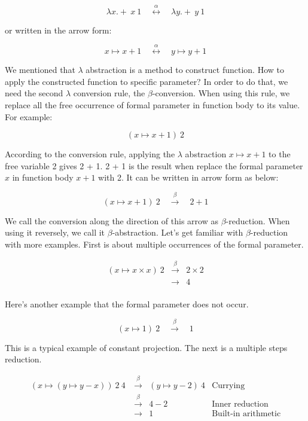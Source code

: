 \documentclass{article}
\begin{document}
\[
\lambda x . +\ x\ 1 \quad \overset{\alpha}{\longleftrightarrow} \quad \lambda y . +\ y\ 1
\]


or written in the arrow form:

\[
x \mapsto x + 1 \quad \overset{\alpha}{\longleftrightarrow} \quad y \mapsto y + 1
\]

We mentioned that $\lambda$ abstraction is a method to construct function. How to apply the constructed function to specific parameter? In order to do that, we need the second $\lambda$ conversion rule, the $\beta$-conversion. When using this rule, we replace all the free occurrence of formal parameter in function body to its value. For example:

\[
(x \mapsto x + 1)\ 2
\]

According to the conversion rule, applying the $\lambda$ abstraction $x \mapsto x + 1$ to the free variable 2 gives 2 + 1. 2 + 1 is the result when replace the formal parameter $x$ in function body $x + 1$ with 2. It can be written in arrow form as below:

\[
(x \mapsto x + 1)\ 2 \quad \overset{\beta}{\longrightarrow} \quad 2 + 1
\]

We call the conversion along the direction of this arrow as $\beta$-reduction. When using it reversely, we call it $\beta$-abstraction. Let's get familiar with $\beta$-reduction with more examples. First is about multiple occurrences of the formal parameter.

\[
\begin{array}{rcl}
(x \mapsto x \times x)\ 2 & \overset{\beta}{\longrightarrow} & 2 \times 2 \\
                          & \longrightarrow & 4 \\
\end{array}
\]

Here's another example that the formal parameter does not occur.

\[
(x \mapsto 1)\ 2 \quad \overset{\beta}{\longrightarrow} \quad 1
\]

This is a typical example of constant projection. The next is a multiple steps reduction.

\[
\begin{array}{rcll}
(x \mapsto (y \mapsto y - x))\ 2\ 4\ & \overset{\beta}{\longrightarrow} & (y \mapsto y - 2)\ 4 & \text{Currying} \\
                                     & \overset{\beta}{\longrightarrow} & 4 - 2 & \text{Inner reduction} \\
                                     & \longrightarrow & 1 & \text{Built-in arithmetic}
\end{array}
\]
\end{document}
